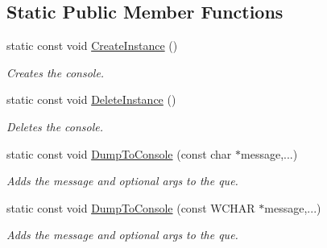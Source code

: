 \subsection*{Static Public Member Functions}
\begin{DoxyCompactItemize}
\item 
static const void \hyperlink{class_ensum_1_1_utils_1_1_console_log_a2081398f0762150043b92047fa97810a}{Create\+Instance} ()\hypertarget{class_ensum_1_1_utils_1_1_console_log_a2081398f0762150043b92047fa97810a}{}\label{class_ensum_1_1_utils_1_1_console_log_a2081398f0762150043b92047fa97810a}

\begin{DoxyCompactList}\small\item\em Creates the console. \end{DoxyCompactList}\item 
static const void \hyperlink{class_ensum_1_1_utils_1_1_console_log_a5510d37e7c7038a022e9ff23f097263d}{Delete\+Instance} ()\hypertarget{class_ensum_1_1_utils_1_1_console_log_a5510d37e7c7038a022e9ff23f097263d}{}\label{class_ensum_1_1_utils_1_1_console_log_a5510d37e7c7038a022e9ff23f097263d}

\begin{DoxyCompactList}\small\item\em Deletes the console. \end{DoxyCompactList}\item 
static const void \hyperlink{class_ensum_1_1_utils_1_1_console_log_a3cb3fc27bd5a6a1a04831e6eb8d79b42}{Dump\+To\+Console} (const char $\ast$message,...)
\begin{DoxyCompactList}\small\item\em Adds the message and optional args to the que. \end{DoxyCompactList}\item 
static const void \hyperlink{class_ensum_1_1_utils_1_1_console_log_ae4cb4119e99b9cdfd71878b5c666523f}{Dump\+To\+Console} (const W\+C\+H\+AR $\ast$message,...)
\begin{DoxyCompactList}\small\item\em Adds the message and optional args to the que. \end{DoxyCompactList}\end{DoxyCompactItemize}
